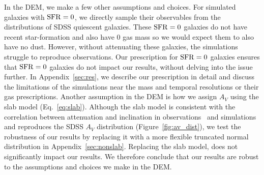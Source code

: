In the DEM, we make a few other assumptions and choices. For simulated galaxies
with ${\rm SFR}=0$, we directly sample their observables from the distributions of 
SDSS quiescent galaxies. These ${\rm SFR}=0$ galaxies do not have recent
star-formation and also have 0 gas mass so we would expect them to also have no dust. However, without
attenuating these galaxies, the simulations struggle to reproduce observations.
Our prescription for ${\rm SFR} = 0$ galaxies ensures that ${\rm SFR}=0$ galaxies do not
impact our results, without delving into the issue further. In
Appendix~\ref{sec:res}, we describe our prescription in detail and discuss the
limitations of the simulations near the mass and temporal resolutions or their
gas prescriptions. Another assumption in the DEM is how we assign $A_V$ using 
the slab model (Eq.~\ref{eq:slab}). Although the slab model is consistent with
the correlation between attenuation and inclination in
observations~\citep[\eg][]{conroy2010, salim2020} and
simulations~\citep[\eg]{chevallard2013, narayanan2018, trayford2020} and
reproduces the SDSS $A_V$ distribution (Figure~\ref{fig:av_dist}),
we test the robustness of our results by replacing it with a more flexible
truncated normal distribution in Appendix~\ref{sec:nonslab}. Replacing the slab
model, does not significantly impact our results. We therefore conclude that
our results are robust to the assumptions and choices we make in the DEM. 



